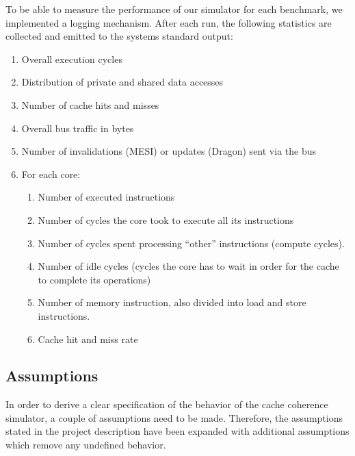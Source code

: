 To be able to measure the performance of our simulator for each benchmark, we
implemented a logging mechanism. After each run, the following statistics are
collected and emitted to the systems standard output:
\begin{enumerate}
    \item Overall execution cycles
    \item Distribution of private and shared data accesses
    \item Number of cache hits and misses
    \item Overall bus traffic in bytes
    \item Number of invalidations (MESI) or updates (Dragon) sent via the bus
    \item For each core:
          \begin{enumerate}
              \item Number of executed instructions
              \item Number of cycles the core took to execute all its instructions
              \item Number of cycles spent processing ``other'' instructions (compute cycles).
              \item Number of idle cycles (cycles the core has to wait in order for
                    the cache to complete its operations)
              \item Number of memory instruction, also divided into load and store instructions.
              \item Cache hit and miss rate
          \end{enumerate}
\end{enumerate}


\subsection{Assumptions}

In order to derive a clear specification of the behavior of the cache coherence
simulator, a couple of assumptions need to be made. Therefore, the assumptions
stated in the project description have been expanded with additional assumptions
which remove any undefined behavior.

